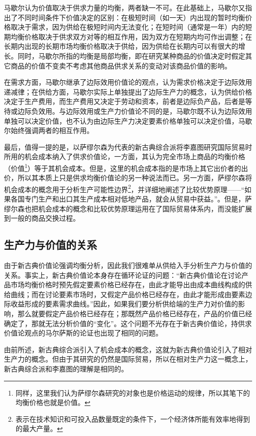 马歇尔认为价值取决于供求力量的均衡，两者缺一不可。在此基础上，马歇尔又指出了不同时间条件下价值决定的区别：在极短时间（如一天）内出现的暂时均衡价格取决于需求，因为供给在极短时间内无法变化；在短时间（通常是一年）内的短期均衡价格取决于供求双方对等的相互作用，因为双方在短期内均可作出调整；在长期内出现的长期市场均衡价格取决于供给，因为供给在长期内可以有很大的增长\cite[299-300]{YanZhiJieXiFangJingJiXueShuoShiJiaoChengDiErBan2013}\cite[390]{YanZhiJieCongBianJiGeMingDaoKaiEnSiGeMing2022}。同时，马歇尔所指的均衡是局部均衡，即在研究某种商品的价值决定时假定其它商品的价值不变卖不考虑其他商品供求关系的变动对该商品价值的影响\cite[391]{YanZhiJieCongBianJiGeMingDaoKaiEnSiGeMing2022}。

 在需求方面，马歇尔继承了边际效用价值论的观点，认为需求价格决定于边际效用递减律；在供给方面，马歇尔实际上单独提出了边际生产力的概念\cite[8223]{macmillanpublishersltdNewPalgraveDictionary2018}，认为供给价格决定于生产费用，而生产费用又决定于劳动和资本，前者是边际负产品，后者是等待或边际负效用\cite[391]{YanZhiJieCongBianJiGeMingDaoKaiEnSiGeMing2022}。与边际效用或生产力价值论不同的是，马歇尔既不认为边际效用单独可以决定价值，也不认为由边际生产力决定要素价格单独可以决定价值，马歇尔始终强调两者的相互作用。

最后，值得一提的是，以萨缪尔森为代表的新古典综合派将李嘉图研究国际贸易时所用的机会成本纳入了供求价值论，一方面，其认为完全市场上商品的均衡价格（价值\footnote{同样，这里我们认为萨缪尔森研究的对象也是价格运动的规律，所以其笔下的均衡价格也就是价值。}）等于其机会成本\cite[228]{BaoLuo*SaMouErSenJingJiXueDiShiJiuBan2012}。但是，这里的机会成本指的是市场上其它出价者的出价\cite[228-229]{BaoLuo*SaMouErSenJingJiXueDiShiJiuBan2012}，所以其本质上只是供求均衡价值论的另一种说法而已。另一方面，萨缪尔森将机会成本的概念用于分析生产可能性边界\footnote{表示在技术知识和可投入品数量既定的条件下，一个经济体所能有效率地得到的最大产量\cite[22]{BaoLuo*SaMouErSenJingJiXueDiShiJiuBan2012}。}，并详细地阐述了比较优势原理——“如果各国专门生产和出口其生产成本相对低地产品，就会从贸易中获益。”\cite[581]{BaoLuo*SaMouErSenJingJiXueDiShiJiuBan2012}。但是，萨缪尔森也把机会成本的概念和比较优势原理运用在了国际贸易体系内，而没能扩展到一般的商品交换过程。

 \subsection{生产力与价值的关系}

 由于新古典价值论强调均衡分析，因此我们很难单从供给入手分析生产力与价值的关系。事实上，新古典价值论本身存在循环论证的问题：“新古典价值论在讨论产品市场均衡价格时预先假定要素价格已经存在，由此才能导出由成本曲线构成的供给曲线；而在讨论要素市场时，又假定产品价格已经存在，由此才能形成由要素边际收益形成的要素需求曲线。”\cite[186]{CaiJiMingCongGuDianZhengZhiJingJiXueDaoZhongGuoTeSeSheHuiZhuYiZhengZhiJingJiXueJiYuZhongGuoShiJiaoDeZhengZhiJingJiXueYanBianShangCe2023}因此，如果我们要分析供给端的生产力对价值的影响，那么就要假定产品价格已经存在；那既然产品价格已经存在，产品的价值已经确定了，那就无法分析价值的“变化”。这个问题不光存在于新古典价值论，持供求价值论观点的马尔萨斯的论证也出现了相同的问题。

由前所述，新古典综合派引入了机会成本的概念，这就为新古典价值论引入了相对生产力的概念。但由于其研究的仍然是国际贸易，所以在相对生产力这一概念上，新古典综合派和李嘉图的理解是相同的。